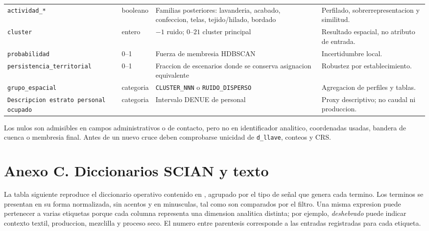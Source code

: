\documentclass[11pt,letterpaper]{article}
\begin{document}
\begin{longtable}{p{}p{}p{}p{}}
\texttt{actividad\_*} & booleano & Familias posteriores: lavanderia, acabado, confeccion, telas, tejido/hilado, bordado & Perfilado, sobrerrepresentacion y similitud. \\
\texttt{cluster} & entero & $-1$ ruido; $0$--$21$ cluster principal & Resultado espacial, no atributo de entrada. \\
\texttt{probabilidad} & 0--1 & Fuerza de membresia HDBSCAN & Incertidumbre local. \\
\texttt{persistencia\_territorial} & 0--1 & Fraccion de escenarios donde se conserva asignacion equivalente & Robustez por establecimiento. \\
\texttt{grupo\_espacial} & categoria & \texttt{CLUSTER\_NNN} o \texttt{RUIDO\_DISPERSO} & Agregacion de perfiles y tablas. \\
\texttt{Descripcion estrato personal ocupado} & categoria & Intervalo DENUE de personal & Proxy descriptivo; no caudal ni produccion. \\
\bottomrule
\end{longtable}

Los nulos son admisibles en campos administrativos o de contacto, pero no en identificador analitico, coordenadas usadas, bandera de cuenca o membresia final. Antes de un nuevo cruce deben comprobarse unicidad de \texttt{d\_llave}, conteos y CRS.

\section{Anexo C. Diccionarios SCIAN y texto}

La tabla siguiente reproduce el diccionario operativo contenido en , agrupado por el tipo de señal que genera cada termino. Los terminos se presentan en su forma normalizada, sin acentos y en minusculas, tal como son comparados por el filtro. Una misma expresion puede pertenecer a varias etiquetas porque cada columna representa una dimension analitica distinta; por ejemplo, \textit{deshebrado} puede indicar contexto textil, produccion, mezclilla y proceso seco. El numero entre parentesis corresponde a las entradas registradas para cada etiqueta.
\end{document}
